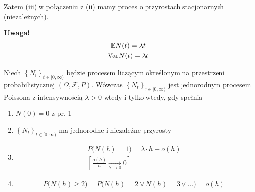 Zatem (iii) w połączeniu z (ii) mamy proces o przyrostach stacjonarnych (niezależnych).

\textbf{Uwaga!}\\
\begin{gather*}
\mathbb E N(t)=\lambda t\\
\text{Var} N(t)=\lambda t
\end{gather*}
\begin{twr}
Niech $ \left\{N_t\right\}_{t\in[0,\infty )} $ będzie procesem liczącym określonym na przestrzeni probabilistycznej $(\Omega,\mathcal F,P)$. Wówczas $ \left\{N_t\right\}_{t\in[0,\infty )} $ jest jednorodnym procesem Poissona z intensywnością $ \lambda>0 $ wtedy i tylko wtedy, gdy spełnia\begin{enumerate}
\item $ N(0)=0 $ z pr. 1
\item $ \left\{N_t\right\}_{t\in[0,\infty )} $ ma jednorodne i niezależne przyrosty
\item 
\begin{gather*}
 P\bigl(N(h)=1\bigr)=\lambda\cdot h+o(h) \\
 \left[\frac{o(h)}{h}\xrightarrow[h\to0]{}0\right]
\end{gather*}
\item 
\begin{gather*}
P\bigl(N(h)\ge2 \bigr)=P\bigl(N(h)=2\vee N(h)=3\vee\dots\bigr)=o(h)
\end{gather*}
\end{enumerate}
\end{twr}
